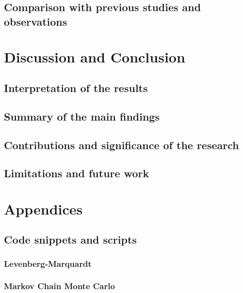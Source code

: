 \documentclass[12pt, TexShade, letterpaper]{report}
\begin{document}
\section{Comparison with previous studies and observations}
\chapter{Discussion and Conclusion}
\label{chap:discussion}
\section{Interpretation of the results}
\section{Summary of the main findings}
\section{Contributions and significance of the research}
\section{Limitations and future work}
\chapter{Appendices}
\section{Code snippets and scripts}	
\subsection{Levenberg-Marquardt}
\label{chap:appendix,sub:LM}
\subsection{Markov Chain Monte Carlo}
\label{chap:appendix,sub:MCMC}
\end{document}
